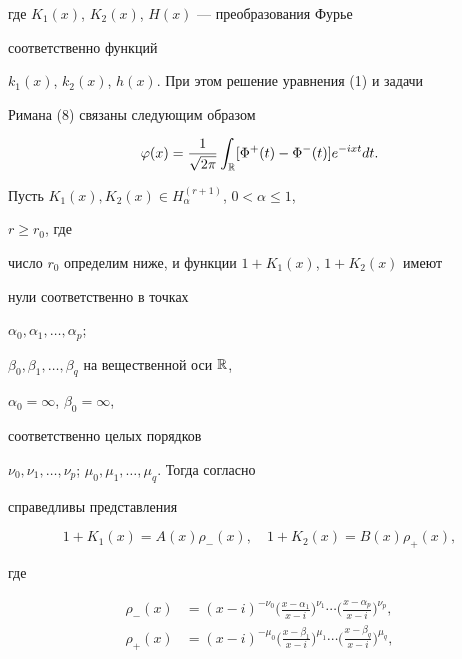 где $K_1(x)$, $K_2(x)$, $H(x)$ --- преобразования Фурье \cite{7} 


соответственно функций 


$k_1(x)$, $k_2(x)$, $h(x)$. При этом решение уравнения (1) и задачи 


Римана (8) связаны следующим образом 


\begin{equation} 


\varphi(x)=\frac{1}{\sqrt{2\pi}}\int_{\Bbb R}[\Phi^+(t)-\Phi^-(t)] 


e^{-ixt}dt. 


\end{equation} 


 


Пусть $K_1(x),K_2(x)\in H^{(r+1)}_\alpha$, $0<\alpha\le 1$, 


$r\ge r_0$, где 


число $r_0$ определим ниже, и функции $1+K_1(x)$, $1+K_2(x)$ имеют 


нули соответственно в точках 


$\alpha_0,\alpha_1,\dotsc,\alpha_p$; 


$\beta_0,\beta_1,\dotsc,\beta_q$ на вещественной оси $\Bbb R$, 


$\alpha_0=\infty$, $\beta_0=\infty$, 


соответственно целых порядков 


$\nu_0,\nu_1,\dotsc,\nu_p$; $\mu_0,\mu_1,\dotsc,\mu_q$. Тогда согласно 


\cite{8} справедливы представления 


\begin{equation} 


1+K_1(x)=A(x)\rho_-(x),\quad 


1+K_2(x)=B(x)\rho_+(x), 


\end{equation} 


где 


\begin{align} 


\rho_-(x)&=(x-i)^{-\nu_0} 


\biggl(\frac{x-\alpha_1}{x-i}\biggr)^{\nu_1}\dotsb 


\biggl(\frac{x-\alpha_p}{x-i}\biggr)^{\nu_p},\\ 


\rho_+(x)&=(x-i)^{-\mu_0} 


\biggl(\frac{x-\beta_1}{x-i}\biggr)^{\mu_1}\dotsb 


\biggl(\frac{x-\beta_q}{x-i}\biggr)^{\mu_q},


\end{align} 



